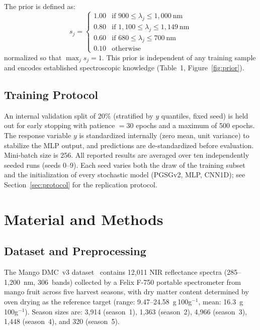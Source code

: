 \documentclass[preprint,12pt,hidelinks]{elsarticle}
\begin{document}
The prior is defined as:
\begin{equation}
  s_j = \begin{cases}
    1.00 & \text{if } 900 \leq \lambda_j \leq 1{,}000~\text{nm} \\
    0.80 & \text{if } 1{,}100 \leq \lambda_j \leq 1{,}149~\text{nm} \\
    0.60 & \text{if } 680 \leq \lambda_j \leq 700~\text{nm} \\
    0.10 & \text{otherwise}
  \end{cases}
  \label{eq:prior}
\end{equation}
normalized so that $\max_j s_j = 1$. This prior is independent of any
training sample and encodes established spectroscopic knowledge (Table~1,
Figure~\ref{fig:prior}).

\subsection{Training Protocol}

An internal validation split of 20\% (stratified by $y$ quantiles, fixed
seed) is held out for early stopping with patience $= 30$ epochs and a
maximum of 500 epochs. The response variable $y$ is standardized
internally (zero mean, unit variance) to stabilize the MLP output, and
predictions are de-standardized before evaluation. Mini-batch size is 256.
All reported results are averaged over ten independently seeded runs
(seeds 0--9). Each seed varies both the draw of the training subset and the
initialization of every stochastic model (PGSGv2, MLP, CNN1D); see
Section~\ref{sec:protocol} for the replication protocol.

\section{Material and Methods}

\subsection{Dataset and Preprocessing}

The Mango DMC~v3 dataset~\cite{anderson2021} contains 12,011 NIR reflectance
spectra (285--1,200~nm, 306~bands) collected by a Felix F-750 portable
spectrometer from mango fruit across five harvest seasons, with dry matter
content determined by oven drying as the reference target
(range: 9.47--24.58~g\,100g$^{-1}$, mean: 16.3~g\,100g$^{-1}$). Season
sizes are: 3,914 (season~1), 1,363 (season~2), 4,966 (season~3), 1,448
(season~4), and 320 (season~5).
\end{document}
